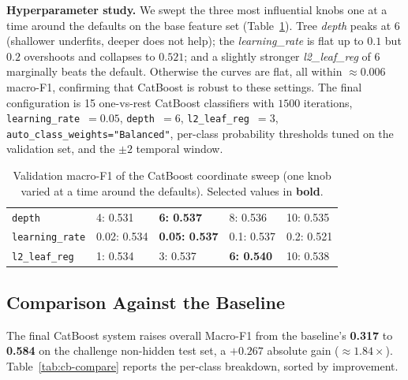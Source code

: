\documentclass{article}
\begin{document}
\textbf{Hyperparameter study.} We swept the three most influential knobs one at a time around the defaults on the base feature set (Table~\ref{tab:cb-hp}). Tree \emph{depth} peaks at $6$ (shallower underfits, deeper does not help); the \emph{learning\_rate} is flat up to $0.1$ but $0.2$ overshoots and collapses to $0.521$; and a slightly stronger \emph{l2\_leaf\_reg} of $6$ marginally beats the default. Otherwise the curves are flat, all within $\approx0.006$ macro-F1, confirming that CatBoost is robust to these settings. The final configuration is 15 one-vs-rest CatBoost classifiers with $1500$ iterations, \texttt{learning\_rate}~$=0.05$, \texttt{depth}~$=6$, \texttt{l2\_leaf\_reg}~$=3$, \texttt{auto\_class\_weights="Balanced"}, per-class probability thresholds tuned on the validation set, and the $\pm2$ temporal window.

\begin{table}[H]
  \caption{Validation macro-F1 of the CatBoost coordinate sweep (one knob varied at a time around the defaults). Selected values in \textbf{bold}.}
  \label{tab:cb-hp}
  \centering
  \small
  \begin{tabular}{lllll}
    \toprule
    \texttt{depth}          & 4: 0.531    & \textbf{6: 0.537}    & 8: 0.536  & 10: 0.535 \\
    \texttt{learning\_rate} & 0.02: 0.534 & \textbf{0.05: 0.537} & 0.1: 0.537 & 0.2: 0.521 \\
    \texttt{l2\_leaf\_reg}  & 1: 0.534    & 3: 0.537             & \textbf{6: 0.540} & 10: 0.538 \\
    \bottomrule
  \end{tabular}
\end{table}

\subsection{Comparison Against the Baseline}

The final CatBoost system raises overall Macro-F1 from the baseline's \textbf{0.317} to \textbf{0.584} on the challenge non-hidden test set, a $+0.267$ absolute gain ($\approx1.84\times$). Table~\ref{tab:cb-compare} reports the per-class breakdown, sorted by improvement.
\end{document}

